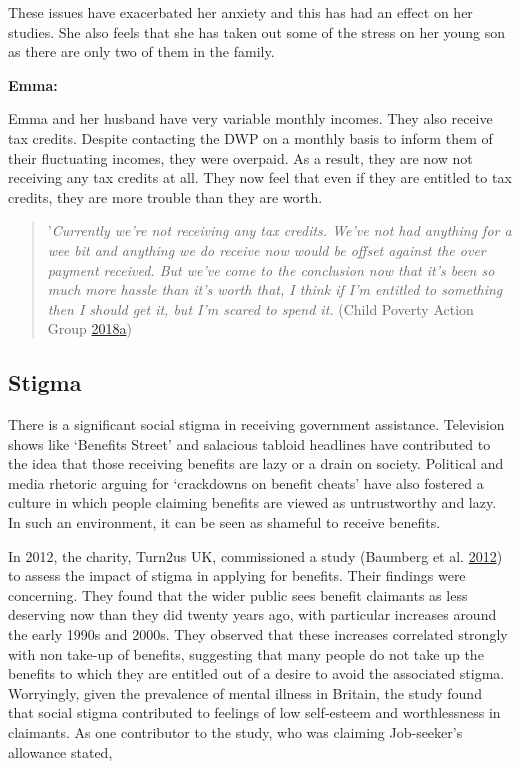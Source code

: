 \documentclass[]{tufte-handout}
\begin{document}
These issues have exacerbated her anxiety and this has had an effect on
her studies. She also feels that she has taken out some of the stress on
her young son as there are only two of them in the family.

\textbf{Emma: }

Emma and her husband have very variable monthly incomes. They also
receive tax credits. Despite contacting the DWP on a monthly basis to
inform them of their fluctuating incomes, they were overpaid. As a
result, they are now not receiving any tax credits at all. They now feel
that even if they are entitled to tax credits, they are more trouble
than they are worth.

\begin{quote}
'\emph{Currently we're not receiving any tax credits. We've not had
anything for a wee bit and anything we do receive now would be offset
against the over payment received. But we've come to the conclusion now
that it's been so much more hassle than it's worth that, I think if I'm
entitled to something then I should get it, but I'm scared to spend it.
}(Child Poverty Action Group
\protect\hyperlink{ref-ChildPovertyActionGroupb}{2018}\protect\hyperlink{ref-ChildPovertyActionGroupb}{a})
\end{quote}

\hypertarget{stigma}{%
\subsection{Stigma}\label{stigma}}

There is a significant social stigma in receiving government assistance.
Television shows like `Benefits Street' and salacious tabloid headlines
have contributed to the idea that those receiving benefits are lazy or a
drain on society. Political and media rhetoric arguing for `crackdowns
on benefit cheats' have also fostered a culture in which people claiming
benefits are viewed as untrustworthy and lazy. In such an environment,
it can be seen as shameful to receive benefits.

In 2012, the charity, Turn2us UK, commissioned a study (Baumberg et al.
\protect\hyperlink{ref-Baumberg2012}{2012}) to assess the impact of
stigma in applying for benefits. Their findings were concerning. They
found that the wider public sees benefit claimants as less deserving now
than they did twenty years ago, with particular increases around the
early 1990s and 2000s. They observed that these increases correlated
strongly with non take-up of benefits, suggesting that many people do
not take up the benefits to which they are entitled out of a desire to
avoid the associated stigma. Worryingly, given the prevalence of mental
illness in Britain, the study found that social stigma contributed to
feelings of low self-esteem and worthlessness in claimants. As one
contributor to the study, who was claiming Job-seeker's allowance
stated,
\end{document}
